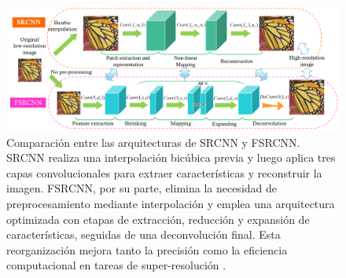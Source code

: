 \documentclass[../main.tex]{subfiles}
\begin{document}
\begin{figure}
    \centering
    \includegraphics[width=0.7\linewidth]{imgs/fundamentos/fsrcnn_arquitectura.png}
    \caption{Comparación entre las arquitecturas de SRCNN y FSRCNN. SRCNN realiza una interpolación bicúbica previa y luego aplica tres capas convolucionales para extraer características y reconstruir la imagen. FSRCNN, por su parte, elimina la necesidad de preprocesamiento mediante interpolación y emplea una arquitectura optimizada con etapas de extracción, reducción y expansión de características, seguidas de una deconvolución final. Esta reorganización mejora tanto la precisión como la eficiencia computacional en tareas de super-resolución \cite{dong2016}.}
    \label{fig:fsrcnn_arquitectura}
\end{figure}
\end{document}
